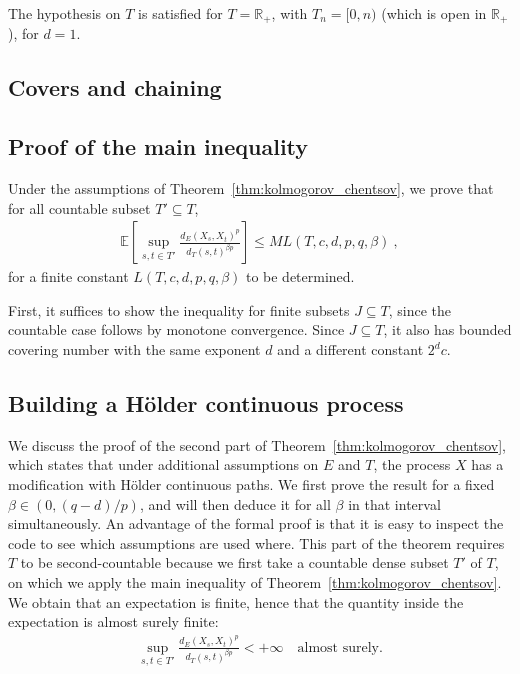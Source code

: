 \documentclass[lean]{Draft}
\begin{document}
The hypothesis on $T$ is satisfied for $T = \mathbb{R}_+$, with $T_n = [0,n)$ (which is open in $\mathbb{R}_+$), for $d = 1$.



\subsection{Covers and chaining}



\subsection{Proof of the main inequality}

Under the assumptions of Theorem~\ref{thm:kolmogorov_chentsov}, we prove that for all countable subset $T' \subseteq T$,
\begin{align*}
  \mathbb{E}\left[ \sup_{s, t \in T'} \frac{d_E(X_s, X_t)^p}{d_T(s, t)^{\beta p}} \right]
  \le M L(T, c, d, p, q, \beta)
  \: ,
\end{align*}
for a finite constant $L(T, c, d, p, q, \beta)$ to be determined.

First, it suffices to show the inequality for finite subsets $J \subseteq T$, since the countable case follows by monotone convergence.
Since $J \subseteq T$, it also has bounded covering number with the same exponent $d$ and a different constant $2^d c$.




\subsection{Building a Hölder continuous process}

We discuss the proof of the second part of Theorem~\ref{thm:kolmogorov_chentsov}, which states that under additional assumptions on $E$ and $T$, the process $X$ has a modification with Hölder continuous paths.
We first prove the result for a fixed $\beta \in (0, (q - d)/p)$, and will then deduce it for all $\beta$ in that interval simultaneously.
An advantage of the formal proof is that it is easy to inspect the code to see which assumptions are used where.
This part of the theorem requires $T$ to be second-countable because we first take a countable dense subset $T'$ of $T$, on which we apply the main inequality of Theorem~\ref{thm:kolmogorov_chentsov}.
We obtain that an expectation is finite, hence that the quantity inside the expectation is almost surely finite:
\begin{align*}
  \sup_{s, t \in T'} \frac{d_E(X_s, X_t)^p}{d_T(s, t)^{\beta p}} < +\infty
  \quad \text{almost surely.}
\end{align*}
\end{document}
